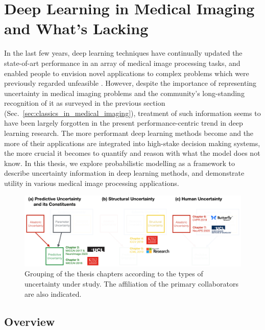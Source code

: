\vspace{-2mm}
\section{Deep Learning in Medical Imaging and What's Lacking} 
\vspace{-2mm}
In the last few years, deep learning techniques have continually updated the state-of-art performance in an array of medical image processing tasks, and enabled people to envision novel applications to complex problems which were previously regarded unfeasible \cite{shen2017deep,litjens2017survey}. However, despite the importance of representing uncertainty in medical imaging problems and the community's long-standing recognition of it as surveyed in the previous section (Sec.~\ref{sec:classics_in_medical_imaging}), treatment of such information seems to have been largely forgotten in the present performance-centric trend in deep learning research. The more performant deep learning methods become and the more of their applications are integrated into high-stake decision making systems, the more crucial it becomes to quantify and reason with what the model does not know. In this thesis, we explore probabilistic modelling as a framework to describe uncertainty information in deep learning methods, and demonstrate utility in various medical image processing applications. 

\begin{figure}[ht]
	\includegraphics[width=\linewidth]{chapter_1/thesis_structure_03.png}
	\centering	
	\vspace{-5mm}
	\caption{\footnotesize Grouping of the thesis chapters according to the types of uncertainty under study. The affiliation of the primary collaborators are also indicated. } 
	\label{fig:thesis_structure}
\end{figure}

\vspace{-4mm}
\subsection*{Overview}

